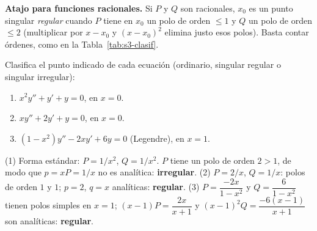 \begin{remark}
\textbf{Atajo para funciones racionales.} Si $P$ y $Q$ son racionales, $x_0$ es un punto singular \emph{regular} cuando $P$ tiene en $x_0$ un polo de orden $\le 1$ y $Q$ un polo de orden $\le 2$ (multiplicar por $x-x_0$ y $(x-x_0)^2$ elimina justo esos polos). Basta contar órdenes, como en la Tabla~\ref{tab:s3-clasif}.
\end{remark}
 
\begin{activity}[Clasifica]
Clasifica el punto indicado de cada ecuación (ordinario, singular regular o singular irregular):
\begin{enumerate}
\item $x^2y''+y'+y=0$, en $x=0$.
\item $xy''+2y'+y=0$, en $x=0$.
\item $(1-x^2)y''-2xy'+6y=0$ (Legendre), en $x=1$.
\end{enumerate}
\end{activity}
 
\begin{solution}
(1) Forma estándar: $P=1/x^2$, $Q=1/x^2$. $P$ tiene un polo de orden $2>1$, de modo que $p=xP=1/x$ no es analítica: \textbf{irregular}. \;
(2) $P=2/x$, $Q=1/x$: polos de orden $1$ y $1$; $p=2$, $q=x$ analíticas: \textbf{regular}. \;
(3) $P=\dfrac{-2x}{1-x^2}$ y $Q=\dfrac{6}{1-x^2}$ tienen polos simples en $x=1$; $(x-1)P=\dfrac{2x}{x+1}$ y $(x-1)^2Q=\dfrac{-6(x-1)}{x+1}$ son analíticas: \textbf{regular}.
\end{solution}
 
